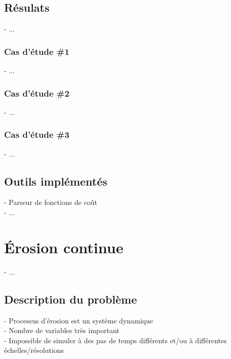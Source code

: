 \subsection{Résulats}
- ...

\subsubsection{Cas d'étude \#1}
- ...

\subsubsection{Cas d'étude \#2}
- ...

\subsubsection{Cas d'étude \#3}
- ...

\subsection{Outils implémentés}
- Parseur de fonctions de coût \\
- ...




\section{Érosion continue}
- ...

\subsection{Description du problème}
- Processus d'érosion est un système dynamique \\
- Nombre de variables très important \\
- Impossible de simuler à des pas de temps différents et/ou à différentes échelles/résolutions

